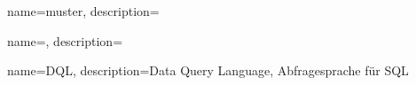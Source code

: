 
{
    name=muster,
    description={}
}

\newglossaryentry{}
{
    name=,
    description={}
}




{
    name=DQL,
    description={Data Query Language, Abfragesprache für SQL}
}


